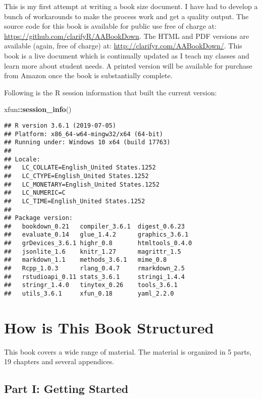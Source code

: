 \documentclass[
]{krantz}
\makeatletter
\newenvironment{Shaded}{\begin{snugshade}}{\end{snugshade}}
\newcommand{\KeywordTok}[1]{\textcolor[rgb]{0.27,0.27,0.27}{\textbf{#1}}}
\newcommand{\NormalTok}[1]{#1}
\newcommand{\OperatorTok}[1]{\textcolor[rgb]{0.43,0.43,0.43}{\textbf{#1}}}
\newenvironment{kframe}{%
\medskip{}
\setlength{\fboxsep}{.8em}
 \def\at@end@of@kframe{}%
 \ifinner\ifhmode%
  \def\at@end@of@kframe{\end{minipage}}%
  \begin{minipage}{\columnwidth}%
 \fi\fi%
 \def\FrameCommand##1{\hskip\@totalleftmargin \hskip-\fboxsep
 \colorbox{shadecolor}{##1}\hskip-\fboxsep
     \hskip-\linewidth \hskip-\@totalleftmargin \hskip\columnwidth}%
 \MakeFramed {\advance\hsize-\width
   \@totalleftmargin\z@ \linewidth\hsize
   \@setminipage}}%
 {\par\unskip\endMakeFramed%
 \at@end@of@kframe}
\renewenvironment{Shaded}{\begin{kframe}}{\end{kframe}}
\makeatother
\begin{document}
This is my first attempt at writing a book size document. I have had to develop a bunch of workarounds to make the process work and get a quality output. The source code for this book is available for public use free of charge at: \url{https://github.com/clarifyR/AABookDown}. The HTML and PDF versions are available (again, free of charge) at: \url{http://clarifyr.com/AABookDown/}. This book is a live document which is continually updated as I teach my classes and learn more about student needs. A printed version will be available for purchase from Amazon once the book is substantially complete.

Following is the R session information that built the current version:

\begin{Shaded}
\begin{Highlighting}[]
\NormalTok{xfun}\OperatorTok{::}\KeywordTok{session_info}\NormalTok{()}
\end{Highlighting}
\end{Shaded}

\begin{verbatim}
## R version 3.6.1 (2019-07-05)
## Platform: x86_64-w64-mingw32/x64 (64-bit)
## Running under: Windows 10 x64 (build 17763)
## 
## Locale:
##   LC_COLLATE=English_United States.1252 
##   LC_CTYPE=English_United States.1252   
##   LC_MONETARY=English_United States.1252
##   LC_NUMERIC=C                          
##   LC_TIME=English_United States.1252    
## 
## Package version:
##   bookdown_0.21   compiler_3.6.1  digest_0.6.23  
##   evaluate_0.14   glue_1.4.2      graphics_3.6.1 
##   grDevices_3.6.1 highr_0.8       htmltools_0.4.0
##   jsonlite_1.6    knitr_1.27      magrittr_1.5   
##   markdown_1.1    methods_3.6.1   mime_0.8       
##   Rcpp_1.0.3      rlang_0.4.7     rmarkdown_2.5  
##   rstudioapi_0.11 stats_3.6.1     stringi_1.4.4  
##   stringr_1.4.0   tinytex_0.26    tools_3.6.1    
##   utils_3.6.1     xfun_0.18       yaml_2.2.0
\end{verbatim}

\hypertarget{how-is-this-book-structured}{%
\section*{How is This Book Structured}\label{how-is-this-book-structured}}


This book covers a wide range of material. The material is organized in 5 parts, 19 chapters and several appendices.

\hypertarget{part-i-getting-started}{%
\subsection*{Part I: Getting Started}\label{part-i-getting-started}}
\end{document}
